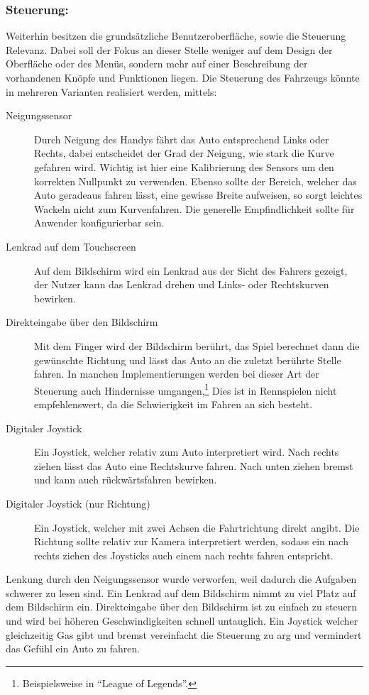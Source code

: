 	\subsubsection*{Steuerung:}
		Weiterhin besitzen die grundsätzliche Benutzeroberfläche, sowie die Steuerung Relevanz. Dabei soll der Fokus an dieser Stelle weniger auf dem Design der Oberfläche oder des Menüs, sondern mehr auf einer Beschreibung der vorhandenen Knöpfe und Funktionen liegen.
		Die Steuerung des Fahrzeugs könnte in mehreren Varianten realisiert werden, mittels:
		\begin{description}
			\item[Neigungssensor]{ Durch Neigung des Handys fährt das Auto entsprechend Links oder Rechts, dabei entscheidet der Grad der Neigung, wie stark die Kurve gefahren wird. Wichtig ist hier eine Kalibrierung des Sensors um den korrekten Nullpunkt zu verwenden. Ebenso sollte der Bereich, welcher das Auto geradeaus fahren lässt, eine gewisse Breite aufweisen, so sorgt leichtes Wackeln nicht zum Kurvenfahren. Die generelle Empfindlichkeit sollte für Anwender konfigurierbar sein. }
			\item[Lenkrad auf dem Touchscreen]{ Auf dem Bildschirm wird ein Lenkrad aus der Sicht des Fahrers gezeigt, der Nutzer kann das Lenkrad drehen und Links- oder Rechtskurven bewirken. }
			\item[Direkteingabe über den Bildschirm]{ Mit dem Finger wird der Bildschirm berührt, das Spiel berechnet dann die gewünschte Richtung und lässt das Auto an die zuletzt berührte Stelle fahren. In manchen Implementierungen werden bei dieser Art der Steuerung auch Hindernisse umgangen,\footnote{Beispielsweise in \enquote{League of Legends}.} Dies ist in Rennspielen nicht empfehlenswert, da die Schwierigkeit im Fahren an sich besteht.  }
			\item[Digitaler Joystick]{ Ein Joystick, welcher relativ zum Auto interpretiert wird. Nach rechts ziehen lässt das Auto eine Rechtskurve fahren. Nach unten ziehen bremst und kann auch rückwärtsfahren bewirken. }
			\item[Digitaler Joystick (nur Richtung)]{ Ein Joystick, welcher mit zwei Achsen die Fahrtrichtung direkt angibt. Die Richtung sollte relativ zur Kamera interpretiert werden, sodass ein nach rechts ziehen des Joysticks auch einem nach rechts fahren entspricht. }
		\end{description}
		Lenkung durch den Neigungssensor wurde verworfen, weil dadurch die Aufgaben schwerer zu lesen sind.
		Ein Lenkrad auf dem Bildschirm nimmt zu viel Platz auf dem Bildschirm ein.
		Direkteingabe über den Bildschirm ist zu einfach zu steuern und wird bei höheren Geschwindigkeiten schnell untauglich.
		Ein Joystick welcher gleichzeitig Gas gibt und bremst vereinfacht die Steuerung zu arg und vermindert das Gefühl ein Auto zu fahren.

